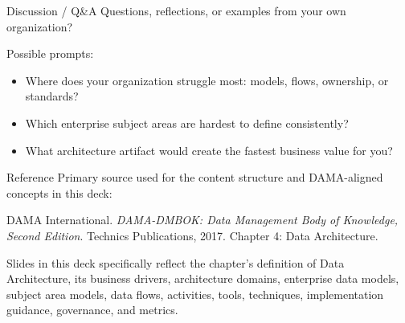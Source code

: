 \documentclass[aspectratio=169,professionalfonts]{beamer}
\begin{document}
\begin{frame}{Discussion / Q\&A}
\Large
\centering
Questions, reflections, or examples from your own organization?

\vspace{1em}
\normalsize
Possible prompts:
\begin{itemize}
    \item Where does your organization struggle most: models, flows, ownership, or standards?
    \item Which enterprise subject areas are hardest to define consistently?
    \item What architecture artifact would create the fastest business value for you?
\end{itemize}
\end{frame}

\begin{frame}[allowframebreaks]{Reference}
\footnotesize
Primary source used for the content structure and DAMA-aligned concepts in this deck:

DAMA International. \emph{DAMA-DMBOK: Data Management Body of Knowledge, Second Edition}. Technics Publications, 2017. Chapter 4: Data Architecture.

\vspace{0.7em}
Slides in this deck specifically reflect the chapter's definition of Data Architecture, its business drivers, architecture domains, enterprise data models, subject area models, data flows, activities, tools, techniques, implementation guidance, governance, and metrics.
\end{frame}
\end{document}
